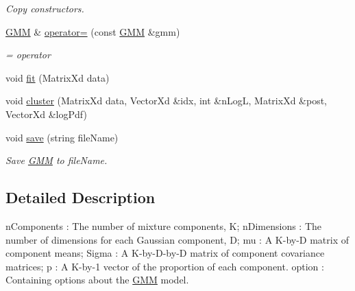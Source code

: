 \begin{DoxyCompactItemize}
\begin{DoxyCompactList}\small\item\em Copy constructors. \end{DoxyCompactList}\item 
\hypertarget{class_g_m_m_a60cc7218be23fa401a804b5d419632b9}{\hyperlink{class_g_m_m}{G\+M\+M} \& \hyperlink{class_g_m_m_a60cc7218be23fa401a804b5d419632b9}{operator=} (const \hyperlink{class_g_m_m}{G\+M\+M} \&gmm)}\label{class_g_m_m_a60cc7218be23fa401a804b5d419632b9}

\begin{DoxyCompactList}\small\item\em = operator \end{DoxyCompactList}\item 
void \hyperlink{class_g_m_m_a8da11088f8e7371786a80d64fc21e378}{fit} (Matrix\+Xd data)
\item 
void \hyperlink{class_g_m_m_a520a9559626e08e3cb4e9863262da300}{cluster} (Matrix\+Xd data, Vector\+Xd \&idx, int \&n\+Log\+L, Matrix\+Xd \&post, Vector\+Xd \&log\+Pdf)
\item 
\hypertarget{class_g_m_m_af57b5c21205ecd53619f67117555388e}{void \hyperlink{class_g_m_m_af57b5c21205ecd53619f67117555388e}{save} (string file\+Name)}\label{class_g_m_m_af57b5c21205ecd53619f67117555388e}

\begin{DoxyCompactList}\small\item\em Save \hyperlink{class_g_m_m}{G\+M\+M} to file\+Name. \end{DoxyCompactList}\end{DoxyCompactItemize}


\subsection{Detailed Description}
n\+Components \+: The number of mixture components, K; n\+Dimensions \+: The number of dimensions for each Gaussian component, D; mu \+: A K-\/by-\/\+D matrix of component means; Sigma \+: A K-\/by-\/\+D-\/by-\/\+D matrix of component covariance matrices; p \+: A K-\/by-\/1 vector of the proportion of each component. option \+: Containing options about the \hyperlink{class_g_m_m}{G\+M\+M} model. 


